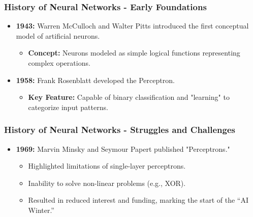 \documentclass[aspectratio=169]{beamer}
\begin{document}
\begin{frame}[fragile]
    \frametitle{History of Neural Networks - Early Foundations}
    \begin{itemize}
        \item \textbf{1943:} Warren McCulloch and Walter Pitts introduced the first conceptual model of artificial neurons.
        \begin{itemize}
            \item \textbf{Concept:} Neurons modeled as simple logical functions representing complex operations.
        \end{itemize}
        
        \item \textbf{1958:} Frank Rosenblatt developed the Perceptron.
        \begin{itemize}
            \item \textbf{Key Feature:} Capable of binary classification and "learning" to categorize input patterns.
        \end{itemize}
    \end{itemize}
\end{frame}

\begin{frame}[fragile]
    \frametitle{History of Neural Networks - Struggles and Challenges}
    \begin{itemize}
        \item \textbf{1969:} Marvin Minsky and Seymour Papert published "Perceptrons."
        \begin{itemize}
            \item Highlighted limitations of single-layer perceptrons.
            \item Inability to solve non-linear problems (e.g., XOR).
            \item Resulted in reduced interest and funding, marking the start of the “AI Winter.”
        \end{itemize}
    \end{itemize}
\end{frame}
\end{document}
